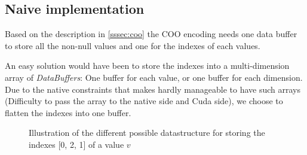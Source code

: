 \subsection{Naive implementation} \label{ssec:naiveCoo}

Based on the description in \ref{sssec:coo} the COO encoding needs one data buffer to store all the non-null values and one for the indexes of each values. 

An easy solution would have been to store the indexes into a multi-dimension array of \textit{DataBuffers}: One buffer for each value, or one buffer for each dimension. Due to the native constraints that makes hardly manageable to have such arrays (Difficulty to pass the array to the native side and Cuda side), we choose to flatten the indexes into one buffer.

\begin{figure}[!h]
	\hfill
	\caption{Illustration of the different possible datastructure for storing the indexes  [0, 2, 1] of a value $v$ }
\end{figure}

